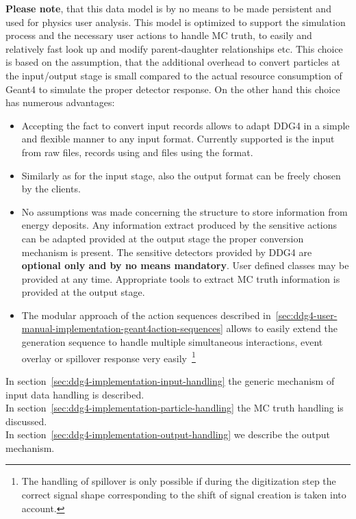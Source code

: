 \noindent
{\bf{Please note}}, that this data model  is by no means to be made persistent 
and used for physics user analysis. This model is optimized to support
the simulation process and the necessary user actions to handle MC truth,
to easily and relatively fast look up and modify parent-daughter 
relationships etc. This choice is based on the assumption, that the 
additional overhead to convert particles at the input/output 
stage is small compared to the actual resource consumption of Geant4
to simulate the proper detector response.
On the other hand this choice has numerous advantages:
\begin{itemize}\itemcompact
\item Accepting the fact to convert input records allows to adapt 
  DDG4 in a simple and flexible manner to any input format. Currently 
  supported is the input from raw {} files, {} 
  records using {} and {} files using the 
  {} format.
\item Similarly as for the input stage, also the output format 
  can be freely chosen by the clients.
\item No assumptions was made concerning the structure to store 
  information from energy deposits. Any information extract produced
  by the sensitive actions can be adapted provided at the output
  stage the proper conversion mechanism is present. The sensitive 
  detectors provided by DDG4 are {\bf{optional only and by no means mandatory}}.
  User defined classes may be provided at any time. Appropriate tools
  to extract MC truth information is provided at the output stage.
\item The modular approach of the action sequences described 
  in~\ref{sec:ddg4-user-manual-implementation-geant4action-sequences}
  allows to easily extend the generation sequence to handle multiple 
  simultaneous interactions, event overlay or spillover response 
  very easily~\footnote{The handling of spillover is only possible 
  if during the digitization step the correct signal shape corresponding
  to the shift of signal creation is taken into account.}
\end{itemize}

\noindent
In section~\ref{sec:ddg4-implementation-input-handling} the generic mechanism
of input data handling is described. \\
In section~\ref{sec:ddg4-implementation-particle-handling} the MC truth 
handling is discussed. \\
In section~\ref{sec:ddg4-implementation-output-handling} we describe the 
output mechanism.
\newpage


